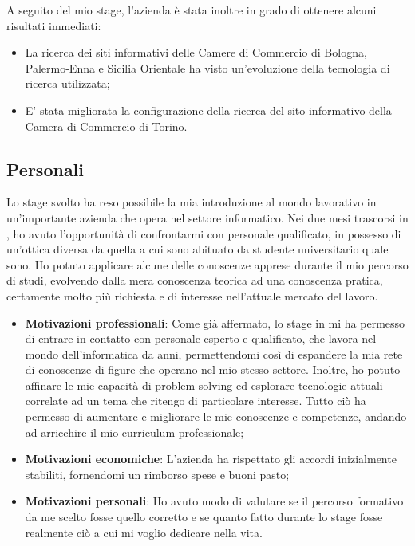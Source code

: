 	A seguito del mio stage, l'azienda è stata inoltre in grado di ottenere alcuni risultati immediati:
	\begin{itemize}
		\item {La ricerca dei siti informativi delle Camere di Commercio di Bologna, Palermo-Enna e Sicilia Orientale ha visto un'evoluzione della tecnologia di ricerca utilizzata;}
		\item {E' stata migliorata la configurazione della ricerca del sito informativo della Camera di Commercio di Torino.}
	\end{itemize}

	\subsection{Personali}
	Lo stage svolto ha reso possibile la mia introduzione al mondo lavorativo in un'importante azienda che opera nel settore informatico. Nei due mesi trascorsi in \nomeAzienda, ho avuto l'opportunità di confrontarmi con personale qualificato, in possesso di un'ottica diversa da quella a cui sono abituato da studente universitario quale sono. Ho potuto applicare alcune delle conoscenze apprese durante il mio percorso di studi, evolvendo dalla mera conoscenza teorica ad una conoscenza pratica, certamente molto più richiesta e di interesse nell'attuale mercato del lavoro.
	
	\begin{itemize}
		
		\item {\textbf{Motivazioni professionali}: Come già affermato, lo stage in \nomeAzienda mi ha permesso di entrare in contatto con personale esperto e qualificato, che lavora nel mondo dell'informatica da anni, permettendomi così di espandere la mia rete di conoscenze di figure che operano nel mio stesso settore. Inoltre, ho potuto affinare le mie capacità di problem solving ed esplorare tecnologie attuali correlate ad un tema che ritengo di particolare interesse. Tutto ciò ha permesso di aumentare e migliorare le mie conoscenze e competenze, andando ad arricchire il mio curriculum professionale;}
		
		\item {\textbf{Motivazioni economiche}: L'azienda ha rispettato gli accordi inizialmente stabiliti, fornendomi un rimborso spese e buoni pasto;}
		
		\item {\textbf{Motivazioni personali}: Ho avuto modo di valutare se il percorso formativo da me scelto fosse quello corretto e se quanto fatto durante lo stage fosse realmente ciò a cui mi voglio dedicare nella vita.}
		
	\end{itemize}

